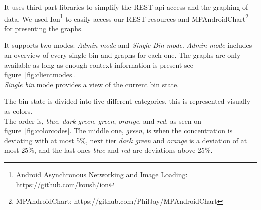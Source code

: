 It uses third part libraries to simplify the REST api access and the graphing of data.
We used Ion\footnote{Android Asynchronous Networking and Image Loading: https://github.com/koush/ion} to easily access our REST resources and MPAndroidChart\footnote{MPAndroidChart: https://github.com/PhilJay/MPAndroidChart} for presenting the graphs.

It supports two modes: \textit{Admin mode} and \textit{Single Bin mode}.
\textit{Admin mode} includes an overview of every single bin and graphs for each one. The graphs are only available as long as enough context information is present see figure~\ref{fig:clientmodes}.\\
\textit{Single bin} mode provides a view of the current bin state.
 
 The bin state is divided into five different categories, this is represented visually as colors.\\
 The order is, \textit{blue}, \textit{dark green}, \textit{green}, \textit{orange}, and \textit{red}, as seen on figure~\ref{fig:colorcodes}.
The middle one, \textit{green}, is when the concentration is deviating with at most 5\%, next tier \textit{dark green} and \textit{orange} is a deviation of at most 25\%, and the last ones \textit{blue} and \textit{red} are deviations above 25\%.

